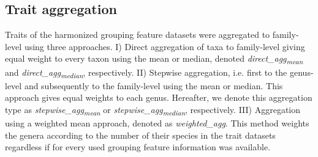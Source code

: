 \documentclass{article}
\begin{document}
\newpage


\subsection*{Trait aggregation}

Traits of the harmonized grouping feature datasets were aggregated to family-level using three approaches. I) Direct aggregation of taxa to family-level giving equal weight to every taxon using the mean or median, denoted \textit{direct\_agg\textsubscript{mean}} and \textit{direct\_agg\textsubscript{median}}, respectively. II) Stepwise aggregation, i.e. first to the genus-level and subsequently to the family-level using the mean or median. This approach gives equal weights to each genus. Hereafter, we denote this aggregation type as \textit{stepwise\_agg\textsubscript{mean}} or \textit{stepwise\_agg\textsubscript{median}}, respectively. III) Aggregation using a weighted mean approach, denoted as \textit{weighted\_agg}. This method weights the genera according to the number of their species in the trait datasets regardless if for every used grouping feature information was available. 

\end{document}
